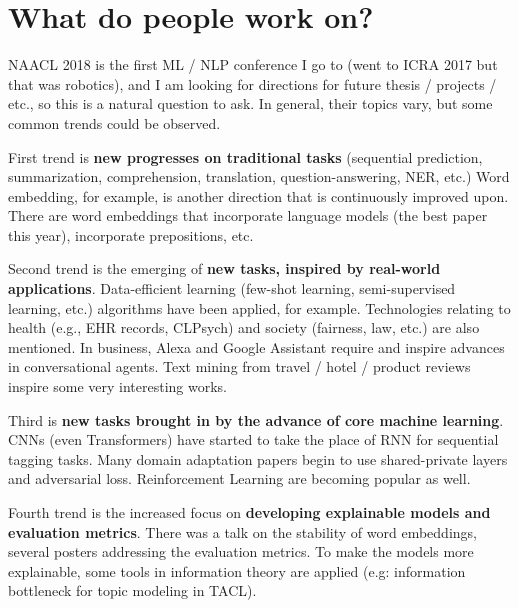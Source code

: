 \section{What do people work on?}
NAACL 2018 is the first ML / NLP conference I go to (went to ICRA 2017 but that was robotics), and I am looking for directions for future thesis / projects / etc., so this is a natural question to ask. In general, their topics vary, but some common trends could be observed.  

First trend is \textbf{new progresses on traditional tasks} (sequential prediction, summarization, comprehension, translation, question-answering, NER, etc.) Word embedding, for example, is another direction that is continuously improved upon. There are word embeddings that incorporate language models (the best paper this year), incorporate prepositions, etc.

Second trend is the emerging of \textbf{new tasks, inspired by real-world applications}. Data-efficient learning (few-shot learning, semi-supervised learning, etc.) algorithms have been applied, for example. Technologies relating to health (e.g., EHR records, CLPsych) and society (fairness, law, etc.) are also mentioned. In business, Alexa and Google Assistant require and inspire advances in conversational agents. Text mining from travel / hotel / product reviews inspire some very interesting works.  

Third is \textbf{new tasks brought in by the advance of core machine learning}. CNNs (even Transformers) have started to take the place of RNN for sequential tagging tasks. Many domain adaptation papers begin to use shared-private layers and adversarial loss. Reinforcement Learning are becoming popular as well.  

Fourth trend is the increased focus on \textbf{developing explainable models and evaluation metrics}. There was a talk on the stability of word embeddings, several posters addressing the evaluation metrics. To make the models more explainable, some tools in information theory are applied (e.g: information bottleneck for topic modeling in TACL).  